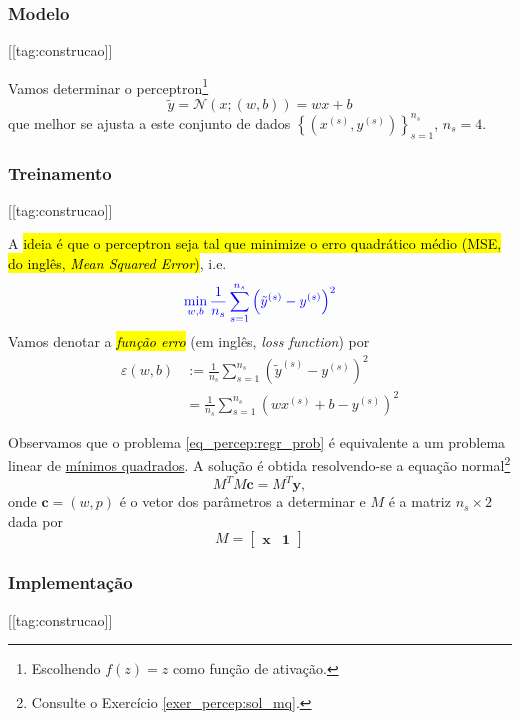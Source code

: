 \subsubsection{Modelo}
[[tag:construcao]]

Vamos determinar o perceptron\footnote{Escolhendo $f(z)=z$ como função de ativação.}
\begin{equation}\label{eq:percep_regr}
  \tilde{y} = \mathcal{N}(x; (w, b)) = wx + b
\end{equation}
que melhor se ajusta a este conjunto de dados $\left\{(x^{(s)}, y^{(s)})\right\}_{s=1}^{n_s}$, $n_s=4$.

\subsubsection{Treinamento}
[[tag:construcao]]

A \hl{ideia é que o perceptron seja tal que minimize o erro quadrático médio (MSE, do inglês, \textit{Mean Squared Error})}, i.e.
\begin{equation}\label{eq_percep:regr_prob}\color{blue}\min_{w,b}\frac{1}{n_s}\sum_{s=1}^{n_s}\left(\tilde{y}^{(s)}-y^{(s)}\right)^2
\end{equation}
Vamos denotar a \hl{\emph{função erro}} (em inglês, \textit{loss function}) por
\begin{align}\label{eq:eqm}
  \varepsilon(w,b) &:= \frac{1}{n_s}\sum_{s=1}^{n_s}\left(\tilde{y}^{(s)}-y^{(s)}\right)^2\\
                   &= \frac{1}{n_s}\sum_{s=1}^{n_s}\left(wx^{(s)}+b-y^{(s)}\right)^2
\end{align}

Observamos que o problema \eqref{eq_percep:regr_prob} é equivalente a um problema linear de \href{https://notaspedrok.com.br/notas/MatematicaNumerica/cap_ajuste_sec_prob_lin.html}{mínimos quadrados}. A solução é obtida resolvendo-se a equação normal\footnote{Consulte o Exercício \ref{exer_percep:sol_mq}.}
\begin{equation}\label{eq_percep:sol_mq}
  M^TM\pmb{c} = M^T\pmb{y},
\end{equation}
onde $\pmb{c} = (w, p)$ é o vetor dos parâmetros a determinar e $M$ é a matriz $n_s\times 2$ dada por
\begin{equation}
  M =
  \begin{bmatrix}
    \pmb{x} & \pmb{1}
  \end{bmatrix}
\end{equation}

\subsubsection{Implementação}
[[tag:construcao]]

